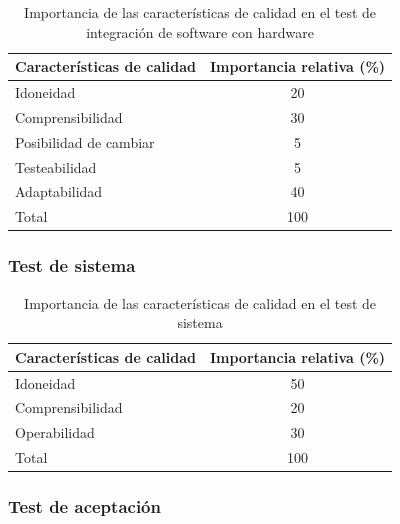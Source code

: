 \documentclass[
11pt, %
codirector, %
]{simple_charter}
\begin{document}
\begin{table}[H]
\centering
\begin{tabular}{@{}lc@{}}
\toprule
\textbf{Características de calidad} & \textbf{Importancia relativa (\%)} \\ \midrule
Idoneidad                           & 20                                 \\
Comprensibilidad                    & 30                                 \\
Posibilidad de cambiar              & 5                                  \\
Testeabilidad                       & 5                                  \\
Adaptabilidad                       & 40                                 \\
Total                               & 100                                \\ \bottomrule
\end{tabular}
\caption{Importancia de las características de calidad en el test de integración de software con
hardware}
\label{tab:ir-int-soft-hard}
\end{table}

\subsubsection{Test de sistema}
\label{sssec:test-de-sistema}

\begin{table}[H]
\centering
\begin{tabular}{@{}lc@{}}
\toprule
\textbf{Características de calidad} & \textbf{Importancia relativa (\%)} \\ \midrule
Idoneidad                           & 50                                 \\
Comprensibilidad                    & 20                                 \\
Operabilidad                        & 30                                 \\
Total                               & 100                                \\ \bottomrule
\end{tabular}
\caption{Importancia de las características de calidad en el test de sistema}
\label{tab:ir-test-sys}
\end{table}

\subsubsection{Test de aceptación}
\label{sssec:test-de-aceptacion}
\end{document}
